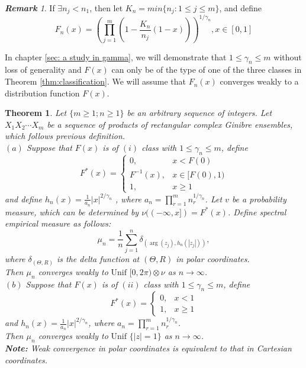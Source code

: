 \documentclass[12pt]{article}
\theoremstyle{plain}
\newtheorem{thm}{\textbf{Theorem}}
\theoremstyle{definition}
\theoremstyle{remark}
\newtheorem{rem}{\textbf{Remark}}
\begin{document}
\begin{rem}\label{Kn F(x)}
If $\exists n_j<n_1$, then let $K_n=min\{ n_j : 1\leq j\leq m\}$, and define
\begin{equation*}
F_n(x)=	\left(\prod_{j=1}^{m} (1-\frac{K_n}{n_j}(1-x))\right) ^{1 / \gamma_{n}},  x \in[0,1]
\end{equation*}
\end{rem}
In chapter \ref{sec: a study in gamma}, we will demonstrate that $1\leq\gamma_{n}\leq m$ without loss of generality and $F(x)$ can only be of the type of one of the three classes in Theorem \ref{thm:classification}. We will assume that $F_n(x)$ converges weakly to a distribution function $F(x)$. 
\begin{thm}\label{thm:main theorem}
	Let $\{m\geq 1;n\geq 1\}$ be an arbitrary sequence of integers. Let $X_1X_2\cdots X_{m}$ be a sequence of products of rectangular complex Ginibre ensembles, which follows previous definition.\\
	
	$(a)$ Suppose that $F(x)$ is of $(i)$ class with $1\leq\gamma_n\leq m$, define 
	\begin{equation*}
	F^{*}(x)=\left\{\begin{array}{cc}{0,} & {x < F(0)} \\ {F^{-1}(x),} & {x \in[F(0),1)} \\ {1,} & {x \geq 1}\end{array}\right.
	\end{equation*}
	and define $h_n(x)=\frac{1}{a_n}|x|^{2/\gamma_{n}}$ , where $a_n=\prod_{r=1}^{m}n_r^{1/\gamma_{n}}$. Let $v$ be a probability measure, which can be determined by $\nu((-\infty,x])=F^*(x)$. Define spectral empirical measure as follows:
	\begin{equation*}
	\mu_{n}=\frac{1}{n} \sum_{j=1}^{n} \delta_{({\arg} (z_{j}), h_n(\left|z_{j}\right|))},
	\end{equation*}
	where  $\delta_{(\Theta,R)}$ is the delta function at $(\Theta,R)$ in polar coordinates.\\
	Then $\mu_{n}$ converges weakly to$\text { Unif }[0,2 \pi) \otimes \nu$ as $n\to \infty$.\\
	
	$(b)$ Suppose that $F(x)$ is of $(ii)$ class with $1\leq\gamma_n\leq m$, define 
	\begin{equation*}
	F^{*}(x)=\left\{\begin{array}{cc}{0,} & {x < 1} \\ {1,} & {x \geq 1}\end{array}\right.
	\end{equation*}
	and $h_n(x)=\frac{1}{a_n}|x|^{2/\gamma_{n}}$, where $a_n=\prod_{r=1}^{m}n_r^{1/\gamma_{n}}$.\\
	Then $\mu_{n}$ converges weakly to$\text { Unif }\{|z|=1\}$ as $n\to \infty$.\\
\textbf{Note:} Weak convergence in polar coordinates is equivalent to that in Cartesian coordinates.
\end{thm}
\end{document}
